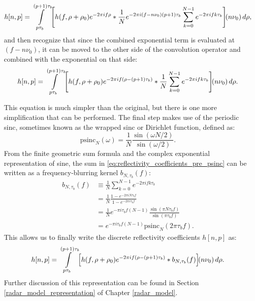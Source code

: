 \begin{equation*}
 h[n,p] = \int\limits_{p\tau_b}^{(p+1)\tau_b} \brak*{ h(f, \rho + \rho_0) e^{-2\pi i f\rho} * \frac{1}{N} e^{-2 \pi i (f - n\nu_0)(p+1)\tau_b} \sum_{k=0}^{N-1} e^{-2\pi i fk\tau_b} }\!(n\nu_0) \dee\rho,
\end{equation*}
and then recognize that since the combined exponential term is evaluated at $(f - n\nu_0)$, it can be moved to the other side of the convolution operator and combined with the exponential on that side:
\begin{equation}\label{eq:reflectivity_coefficients_pre_psinc}
 h[n,p] = \int\limits_{p\tau_b}^{(p+1)\tau_b} \brak*{ h(f, \rho + \rho_0) e^{-2\pi i f (\rho - (p+1)\tau_b)} * \frac{1}{N} \sum_{k=0}^{N-1} e^{-2\pi i fk\tau_b} }\!(n\nu_0) \dee\rho.
\end{equation}

This equation is much simpler than the original, but there is one more simplification that can be performed. The final step makes use of the periodic sinc, sometimes known as the wrapped sinc or Dirichlet function, defined as:
\begin{equation}
 \mathrm{psinc}_N(\omega) = \frac{1}{N} \frac{\sin(\omega N / 2)}{\sin(\omega / 2)}.
\end{equation}
From the finite geometric sum formula and the complex exponential representation of sine, the sum in \eqref{eq:reflectivity_coefficients_pre_psinc} can be written as a frequency-blurring kernel $b_{N,\tau_b}(f)$:
\begin{align}
 b_{N,\tau_b}(f) &\equiv \frac{1}{N} \sum_{k=0}^{N-1} e^{-2\pi i fk\tau_b}\nonumber\\
 &= \frac{1}{N} \frac{1 - e^{-2 \pi i N \tau_b f}}{1 - e^{-2 \pi i \tau_b f}}\nonumber\\
 &= \frac{1}{N} e^{-\pi i \tau_b f (N-1)} \frac{\sin(\pi N \tau_b f)}{\sin(\pi \tau_b f)}\\
 &= e^{-\pi i \tau_b f (N-1)} \mathrm{psinc}_N(2\pi \tau_b f).
\end{align}
This allows us to finally write the discrete reflectivity coefficients $h[n,p]$ as:
\begin{align}\label{eq:reflectivity_coefficients_simplified}
 h[n,p] = \int\limits_{p\tau_b}^{(p+1)\tau_b} \brak*{ h(f, \rho + \rho_0) e^{-2\pi i f (\rho - (p+1)\tau_b)} * b_{N,\tau_b}(f) }\!(n\nu_0) \dee\rho.
\end{align}
Further discussion of this representation can be found in Section \ref{radar_model_representation} of Chapter \ref{radar_model}.